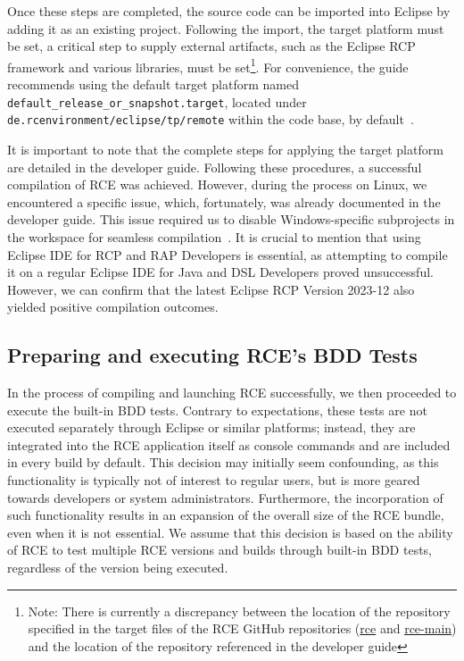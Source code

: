 Once these steps are completed, the source code can be imported into Eclipse by adding it as an existing project. Following the import, the target platform must be set, a critical step to supply external artifacts, such as the Eclipse RCP framework and various libraries, must be set\footnote{Note: There is currently a discrepancy between the location of the repository specified in the target files of the RCE GitHub repositories (\href{https://github.com/rcenvironment/rce/blob/master/de.rcenvironment/eclipse/tp/remote/default_release_or_snapshot.target}{rce} and \href{https://github.com/rcenvironment/rce-main/blob/main/de.rcenvironment/eclipse/tp/remote/default_release_or_snapshot.target}{rce-main}) and the location of the repository referenced in the developer guide}. For convenience, the guide recommends using the default target platform named \texttt{default\_release\_or\_snapshot.target}, located under \texttt{de.rcenvironment/eclipse/tp/remote} within the code base, by default~\cite{rceDevGuide10x}.

It is important to note that the complete steps for applying the target platform are detailed in the developer guide. Following these procedures, a successful compilation of \ac{RCE} was achieved. However, during the process on Linux, we encountered a specific issue, which, fortunately, was already documented in the developer guide. This issue required us to disable Windows-specific subprojects in the workspace for seamless compilation~\cite{rceDevGuide10x}. It is crucial to mention that using Eclipse IDE for RCP and RAP Developers is essential, as attempting to compile it on a regular Eclipse IDE for Java and DSL Developers proved unsuccessful. However, we can confirm that the latest Eclipse RCP Version 2023-12 also yielded positive compilation outcomes.

\subsection{Preparing and executing \ac{RCE}'s BDD Tests}
\label{subsec:PreparingRCETests}
In the process of compiling and launching \ac{RCE} successfully, we then proceeded to execute the built-in BDD tests. Contrary to expectations, these tests are not executed separately through Eclipse or similar platforms; instead, they are integrated into the \ac{RCE} application itself as console commands and are included in every build by default. This decision may initially seem confounding, as this functionality is typically not of interest to regular users, but is more geared towards developers or system administrators. Furthermore, the incorporation of such functionality results in an expansion of the overall size of the \ac{RCE} bundle, even when it is not essential. We assume that this decision is based on the ability of \ac{RCE} to test multiple \ac{RCE} versions and builds through built-in BDD tests, regardless of the version being executed.

